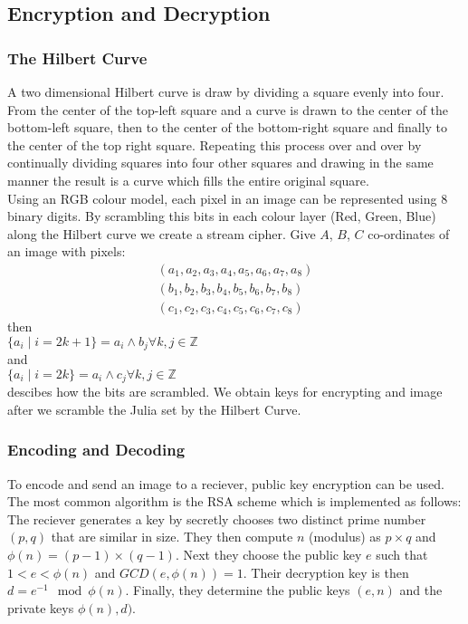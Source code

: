 \documentclass[12pt]{article}
\begin{document}
\subsection{Encryption and Decryption}
{\parindent0pt
\subsubsection{The Hilbert Curve}
A two dimensional Hilbert curve is draw by dividing a square evenly into four. From the center of the top-left square and a curve is drawn to the center of the bottom-left square, then to the center of the bottom-right square and finally to the center of the top right square. \cite{algo} Repeating this process over and over by continually dividing squares into four other squares and drawing in the same manner the result is a curve which fills the entire original square. \\

Using an RGB colour model, each pixel in an image can be represented using 8 binary digits. By scrambling this bits in each colour layer (Red, Green, Blue) along the Hilbert curve we create a stream cipher. Give $A$, $B$, $C$ co-ordinates of an image with pixels:
\begin{align*}
 (a_1,a_2,a_3,a_4,a_5,a_6,a_7,a_8) \\
(b_1,b_2,b_3,b_4,b_5,b_6,b_7,b_8) \\
(c_1,c_2,c_3,c_4,c_5,c_6,c_7,c_8)
\end{align*}
then \\
$\{a_i  	\mid  i = 2k+1\}  = a_i \wedge b_j \forall k,j \in \mathbb{Z} $ \\
and \\
$\{a_i  	\mid  i = 2k\}  = a_i \wedge c_j \forall k,j \in \mathbb{Z} $ \\

descibes how the bits are scrambled. \cite{algo} We obtain keys for encrypting and image after we scramble the Julia set by the Hilbert Curve.

\subsubsection{Encoding and Decoding}
To encode and send an image to a reciever, public key encryption can be used. The most common algorithm is the RSA scheme which is implemented as follows:\cite{moham} \\

The reciever generates a key by secretly chooses two distinct prime number $(p,q)$ that are similar in size. They then compute $n$ (modulus) as $p \times q$ and $\phi (n) = (p-1)\times (q-1)$. Next they choose the public key $e$ such that $1 < e < \phi (n)$ and $GCD(e, \phi (n)) = 1$. Their decryption key is then $d = e^{-1} \mod \phi(n)$. Finally, they determine the public keys $(e,n)$ and the private keys $\phi (n), d)$.  \\

}
\end{document}
